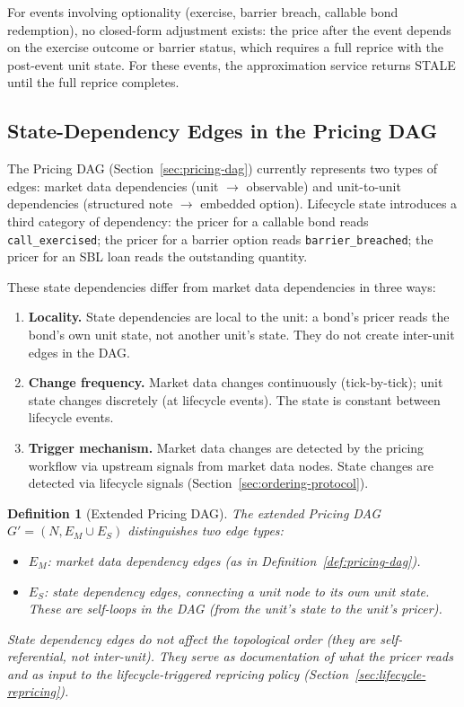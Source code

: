 \documentclass[11pt,a4paper]{article}
\newtheorem{definition}{Definition}[section]
\begin{document}
\noindent For events involving optionality (exercise, barrier breach, callable bond redemption), no closed-form adjustment exists: the price after the event depends on the exercise outcome or barrier status, which requires a full reprice with the post-event unit state.  For these events, the approximation service returns STALE until the full reprice completes.

\subsection{State-Dependency Edges in the Pricing DAG}
\label{sec:state-dag-edges}

The Pricing DAG (Section~\ref{sec:pricing-dag}) currently represents two types of edges: market data dependencies (unit $\to$ observable) and unit-to-unit dependencies (structured note $\to$ embedded option).  Lifecycle state introduces a third category of dependency: the pricer for a callable bond reads \texttt{call\_exercised}; the pricer for a barrier option reads \texttt{barrier\_breached}; the pricer for an SBL loan reads the outstanding quantity.

These state dependencies differ from market data dependencies in three ways:

\begin{enumerate}
\item \textbf{Locality.}  State dependencies are local to the unit: a bond's pricer reads the bond's own unit state, not another unit's state.  They do not create inter-unit edges in the DAG.

\item \textbf{Change frequency.}  Market data changes continuously (tick-by-tick); unit state changes discretely (at lifecycle events).  The state is constant between lifecycle events.

\item \textbf{Trigger mechanism.}  Market data changes are detected by the pricing workflow via upstream signals from market data nodes.  State changes are detected via lifecycle signals (Section~\ref{sec:ordering-protocol}).
\end{enumerate}

\begin{definition}[Extended Pricing DAG]
\label{def:extended-dag}
The extended Pricing DAG $G' = (N, E_M \cup E_S)$ distinguishes two edge types:
\begin{itemize}[nosep]
\item $E_M$: market data dependency edges (as in Definition~\ref{def:pricing-dag}).
\item $E_S$: state dependency edges, connecting a unit node to its own unit state.  These are self-loops in the DAG (from the unit's state to the unit's pricer).
\end{itemize}
State dependency edges do not affect the topological order (they are self-referential, not inter-unit).  They serve as documentation of what the pricer reads and as input to the lifecycle-triggered repricing policy (Section~\ref{sec:lifecycle-repricing}).
\end{definition}
\end{document}
